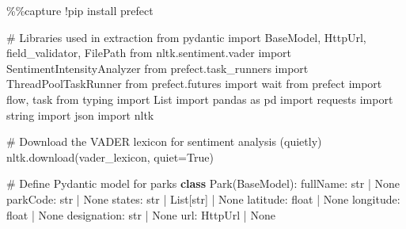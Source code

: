 \documentclass[
  letterpaper,
  DIV=11,
  numbers=noendperiod]{scrartcl}
\newenvironment{Shaded}{\begin{snugshade}}{\end{snugshade}}
\newcommand{\BuiltInTok}[1]{\textcolor[rgb]{0.00,0.23,0.31}{#1}}
\newcommand{\CommentTok}[1]{\textcolor[rgb]{0.37,0.37,0.37}{#1}}
\newcommand{\ImportTok}[1]{\textcolor[rgb]{0.00,0.46,0.62}{#1}}
\newcommand{\KeywordTok}[1]{\textcolor[rgb]{0.00,0.23,0.31}{\textbf{#1}}}
\newcommand{\NormalTok}[1]{\textcolor[rgb]{0.00,0.23,0.31}{#1}}
\newcommand{\OperatorTok}[1]{\textcolor[rgb]{0.37,0.37,0.37}{#1}}
\newcommand{\StringTok}[1]{\textcolor[rgb]{0.13,0.47,0.30}{#1}}
\newcommand{\VariableTok}[1]{\textcolor[rgb]{0.07,0.07,0.07}{#1}}
\begin{document}
\begin{Shaded}
\begin{Highlighting}[]
\OperatorTok{\%\%}\NormalTok{capture}
\OperatorTok{!}\NormalTok{pip install prefect}
\end{Highlighting}
\end{Shaded}

\begin{Shaded}
\end{Shaded}

\begin{Shaded}
\begin{Highlighting}[]
\CommentTok{\# Libraries used in extraction}
\ImportTok{from}\NormalTok{ pydantic }\ImportTok{import}\NormalTok{ BaseModel, HttpUrl, field\_validator, FilePath}
\ImportTok{from}\NormalTok{ nltk.sentiment.vader }\ImportTok{import}\NormalTok{ SentimentIntensityAnalyzer}
\ImportTok{from}\NormalTok{ prefect.task\_runners }\ImportTok{import}\NormalTok{ ThreadPoolTaskRunner}
\ImportTok{from}\NormalTok{ prefect.futures }\ImportTok{import}\NormalTok{ wait}
\ImportTok{from}\NormalTok{ prefect }\ImportTok{import}\NormalTok{ flow, task}
\ImportTok{from}\NormalTok{ typing }\ImportTok{import}\NormalTok{ List}
\ImportTok{import}\NormalTok{ pandas }\ImportTok{as}\NormalTok{ pd}
\ImportTok{import}\NormalTok{ requests}
\ImportTok{import}\NormalTok{ string}
\ImportTok{import}\NormalTok{ json}
\ImportTok{import}\NormalTok{ nltk}

\CommentTok{\# Download the VADER lexicon for sentiment analysis (quietly)}
\NormalTok{nltk.download(}\StringTok{\textquotesingle{}vader\_lexicon\textquotesingle{}}\NormalTok{, quiet}\OperatorTok{=}\VariableTok{True}\NormalTok{)}

\CommentTok{\# Define Pydantic model for parks}
\KeywordTok{class}\NormalTok{ Park(BaseModel):}
\NormalTok{    fullName: }\BuiltInTok{str} \OperatorTok{|} \VariableTok{None}
\NormalTok{    parkCode: }\BuiltInTok{str} \OperatorTok{|} \VariableTok{None}
\NormalTok{    states: }\BuiltInTok{str} \OperatorTok{|}\NormalTok{ List[}\BuiltInTok{str}\NormalTok{] }\OperatorTok{|} \VariableTok{None}
\NormalTok{    latitude: }\BuiltInTok{float} \OperatorTok{|} \VariableTok{None}
\NormalTok{    longitude: }\BuiltInTok{float} \OperatorTok{|} \VariableTok{None}
\NormalTok{    designation: }\BuiltInTok{str} \OperatorTok{|} \VariableTok{None}
\NormalTok{    url: HttpUrl }\OperatorTok{|} \VariableTok{None}


\end{Highlighting}
\end{Shaded}
\end{document}
